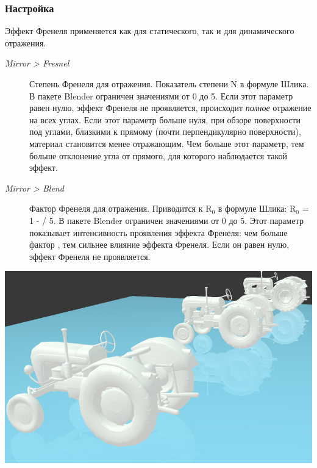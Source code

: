 \documentclass[a4paper,12pt,oneside]{sphinxmanual}
\begin{document}
\subsubsection{Настройка}
\label{materials:id12}
Эффект Френеля применяется как для статического, так и для динамического отражения.
\begin{description}
\item[{\emph{Mirror \textgreater{} Fresnel}}] \leavevmode
Степень Френеля для отражения. Показатель степени N в формуле Шлика. В пакете Blender ограничен значениями от 0 до 5. Если этот параметр равен нулю, эффект Френеля не проявляется, происходит \emph{полное} отражение на всех углах. Если этот параметр больше нуля, при обзоре поверхности под углами, близкими к прямому (почти перпендикулярно поверхности), материал становится менее отражающим. Чем больше этот параметр, тем больше отклонение угла от прямого, для которого наблюдается такой эффект.

\item[{\emph{Mirror \textgreater{} Blend}}] \leavevmode
Фактор Френеля для отражения. Приводится к R$_{\text{0}}$ в формуле Шлика: R$_{\text{0}}$ = 1 -  / 5. В пакете Blender ограничен значениями от 0 до 5. Этот параметр показывает интенсивность проявления эффекта Френеля: чем больше фактор , тем сильнее влияние эффекта Френеля. Если он равен нулю, эффект Френеля не проявляется.

\end{description}

{\hfill\includegraphics[width=1.000\linewidth]{reflection_dynamic_and_fresnel.jpg}\hfill}

\begin{DUlineblock}{0em}
\item[] 
\end{DUlineblock}
\end{document}

